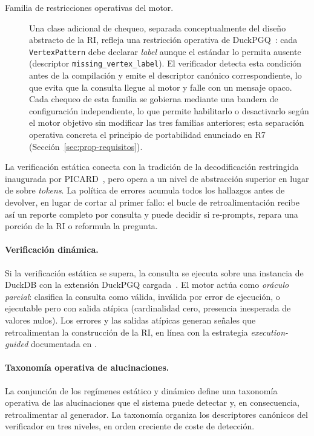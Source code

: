 \begin{description}
    \item[Familia de restricciones operativas del motor.] Una clase adicional de chequeo, separada conceptualmente del diseño abstracto de la \ac{RI}, refleja una restricción operativa de DuckPGQ~\cite{DuckPGQ}: cada \texttt{VertexPattern} debe declarar \emph{label} aunque el estándar lo permita ausente (descriptor \texttt{missing\_vertex\_label}). El verificador detecta esta condición antes de la compilación y emite el descriptor canónico correspondiente, lo que evita que la consulta llegue al motor y falle con un mensaje opaco. Cada chequeo de esta familia se gobierna mediante una bandera de configuración independiente, lo que permite habilitarlo o desactivarlo según el motor objetivo sin modificar las tres familias anteriores; esta separación operativa concreta el principio de portabilidad enunciado en R7 (Sección~\ref{sec:prop-requisitos}).
\end{description}

La verificación estática conecta con la tradición de la decodificación restringida inaugurada por \textsc{PICARD}~\cite{PICARD2022}, pero opera a un nivel de abstracción superior en lugar de sobre \emph{tokens}. La política de errores acumula todos los hallazgos antes de devolver, en lugar de cortar al primer fallo: el bucle de retroalimentación recibe así un reporte completo por consulta y puede decidir si re-prompts, repara una porción de la \ac{RI} o reformula la pregunta.

\paragraph{Verificación dinámica.} Si la verificación estática se supera, la consulta se ejecuta sobre una instancia de DuckDB con la extensión DuckPGQ cargada~\cite{DuckPGQ}. El motor actúa como \emph{oráculo parcial}: clasifica la consulta como válida, inválida por error de ejecución, o ejecutable pero con salida atípica (cardinalidad cero, presencia inesperada de valores nulos). Los errores y las salidas atípicas generan señales que retroalimentan la construcción de la \ac{RI}, en línea con la estrategia \emph{execution-guided} documentada en \cite{CHESS2024, TS-SQL2025, SQLHD2025}. %

\paragraph{Taxonomía operativa de alucinaciones.}\label{subsec:alucinaciones}
La conjunción de los regímenes estático y dinámico define una taxonomía operativa de las alucinaciones que el sistema puede detectar y, en consecuencia, retroalimentar al generador. La taxonomía organiza los descriptores canónicos del verificador en tres niveles, en orden creciente de coste de detección.


